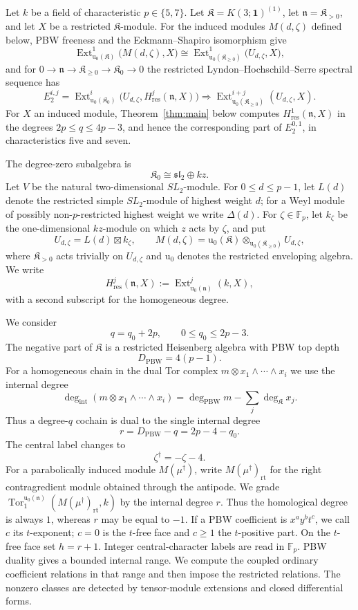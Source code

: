 \documentclass[11pt]{article}
\theoremstyle{plain}
\theoremstyle{definition}
\theoremstyle{remark}
\numberwithin{equation}{section}
\newcommand{\kk}{k}
\newcommand{\F}{\mathbb F}
\newcommand{\Kalg}{\mathfrak K}
\newcommand{\slie}{\mathfrak{sl}_2}
\newcommand{\Ext}{\operatorname{Ext}}
\newcommand{\Tor}{\operatorname{Tor}}
\newcommand{\uenv}{\mathrm u}
\newcommand{\Dlt}{\Delta}
\begin{document}
Let $\kk$ be a field of characteristic $p\in\{5,7\}$.
Let $\Kalg=K(3;\mathbf1)^{(1)}$, let $\mathfrak n=\Kalg_{>0}$, and let $X$ be a restricted
$\Kalg$-module.  For the induced modules $M(d,\zeta)$ defined below, PBW freeness and the
Eckmann--Shapiro isomorphism give
\[
 \Ext^1_{\uenv_0(\Kalg)}\bigl(M(d,\zeta),X\bigr)
 \cong
 \Ext^1_{\uenv_0(\Kalg_{\ge0})}\bigl(U_{d,\zeta},X\bigr),
\]
and for $0\to\mathfrak n\to\Kalg_{\ge0}\to\Kalg_0\to0$ the restricted
Lyndon--Hochschild--Serre spectral sequence has
\begin{equation}\label{eq:LHS}
 E_2^{i,j}
 =\Ext^i_{\uenv_0(\Kalg_0)}
 \bigl(U_{d,\zeta},H^j_{\mathrm{res}}(\mathfrak n,X)\bigr)
 \Longrightarrow
 \Ext^{i+j}_{\uenv_0(\Kalg_{\ge0})}(U_{d,\zeta},X).
\end{equation}
For $X$ an induced module, Theorem~\ref{thm:main} below computes
$H^1_{\mathrm{res}}(\mathfrak n,X)$ in the degrees $2p\le q\le4p-3$, and hence the
corresponding part of $E_2^{0,1}$, in characteristics five and seven.

The degree-zero subalgebra is
\[
 \Kalg_0\cong\slie\oplus\kk z.
\]
Let $V$ be the natural two-dimensional $SL_2$-module.  For $0\le d\le p-1$, let $L(d)$
denote the restricted simple $SL_2$-module of highest weight $d$; for a Weyl module of
possibly non-$p$-restricted highest weight we write $\Dlt(d)$.  For $\zeta\in\F_p$, let
$\kk_\zeta$ be the one-dimensional $\kk z$-module on which $z$ acts by $\zeta$, and put
\[
 U_{d,\zeta}=L(d)\boxtimes\kk_\zeta,
 \qquad
 M(d,\zeta)=\uenv_0(\Kalg)\otimes_{\uenv_0(\Kalg_{\ge0})}U_{d,\zeta},
\]
where $\Kalg_{>0}$ acts trivially on $U_{d,\zeta}$ and $\uenv_0$ denotes the restricted
enveloping algebra.  We write
\[
 H^j_{\mathrm{res}}(\mathfrak n,X)
 :=\Ext^j_{\uenv_0(\mathfrak n)}(\kk,X),
\]
with a second subscript for the homogeneous degree.

We consider
\[
 q=q_0+2p,
 \qquad
 0\le q_0\le2p-3.
\]
The negative part of $\Kalg$ is a restricted Heisenberg algebra with PBW top depth
\[
 D_{\mathrm{PBW}}=4(p-1).
\]
For a homogeneous chain in the dual Tor complex
$m\otimes x_1\wedge\cdots\wedge x_i$ we use the internal degree
\[
 \deg_{\mathrm{int}}(m\otimes x_1\wedge\cdots\wedge x_i)
 =\deg_{\mathrm{PBW}}m-\sum_j\deg_{\Kalg}x_j.
\]
Thus a degree-$q$ cochain is dual to the single internal degree
\[
 r=D_{\mathrm{PBW}}-q=2p-4-q_0.
\]
The central label changes to
\[
 \zeta^\dagger=-\zeta-4.
\]
For a parabolically induced module $M(\mu^\dagger)$, write $M(\mu^\dagger)_{\mathrm{rt}}$ for the right contragredient module obtained through the antipode.  We grade
\(\Tor^{\uenv_0(\mathfrak n)}_1(M(\mu^\dagger)_{\mathrm{rt}},\kk)\)
by the internal degree $r$.  Thus the homological degree is always $1$, whereas $r$ may
be equal to $-1$.  If a PBW coefficient is $x^ay^bt^c$, we call $c$ its $t$-exponent; $c=0$ is the
$t$-free face and $c\ge1$ the $t$-positive part.  On the $t$-free face set $h=r+1$.
Integer central-character labels are read in $\F_p$.  PBW duality gives a bounded internal range. We compute the coupled
ordinary coefficient relations in that range and then impose the restricted
relations. The nonzero classes are detected by tensor-module extensions and
closed differential forms.
\end{document}
